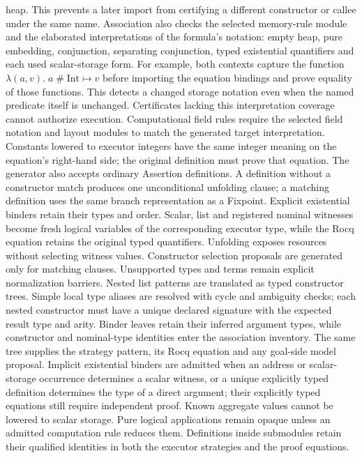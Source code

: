 heap. This prevents a later import from certifying a different constructor or
callee under the same name. Association also checks the selected memory-rule
module and the elaborated interpretations of the formula's notation: empty
heap, pure embedding, conjunction, separating conjunction, typed existential
quantifiers and each used scalar-storage form. For example, both contexts
capture the function $\lambda(a,v).\;a\mathbin{\#}\mathrm{Int}\mapsto v$
before importing the equation bindings and prove equality of those functions.
This detects a changed storage notation even when the named predicate itself
is unchanged. Certificates lacking this interpretation coverage cannot
authorize execution. Computational field rules require the selected
field notation and layout modules to match the generated target interpretation.
Constants lowered to executor integers have the same integer meaning on the
equation's right-hand side; the original definition must prove that equation.
The generator also accepts ordinary Assertion definitions. A definition
without a constructor match produces one unconditional unfolding clause;
a matching definition uses the same branch representation as a Fixpoint.
Explicit existential binders retain their types and order. Scalar, list and
registered nominal witnesses become fresh logical variables of the corresponding
executor type, while the Rocq equation retains the original typed quantifiers.
Unfolding exposes resources without selecting witness values. Constructor
selection proposals are generated only for matching clauses. Unsupported
types and terms remain explicit normalization barriers.
Nested list patterns are translated as typed constructor trees. Simple local
type aliases are resolved with cycle and ambiguity checks; each nested
constructor must have a unique declared signature with the expected result
type and arity. Binder leaves retain their inferred argument types, while
constructor and nominal-type identities enter the association inventory.
The same tree supplies the strategy pattern, its Rocq equation and any
goal-side model proposal. Implicit existential binders are admitted when an
address or scalar-storage occurrence determines a scalar witness, or a unique
explicitly typed definition determines the type of a direct argument; their
explicitly typed equations still require independent proof. Known aggregate
values cannot be lowered to scalar storage.
Pure logical applications remain opaque unless an admitted computation rule
reduces them. Definitions inside submodules retain their qualified identities
in both the executor strategies and the proof equations.

